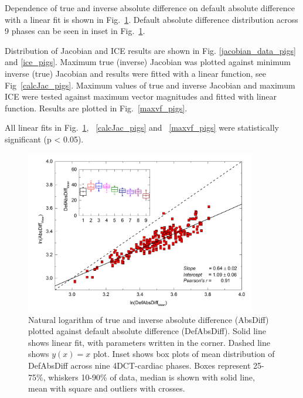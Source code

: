 \documentclass[type=dr, dr=rernat, accentcolor=tud7b,colorbacktitle, bigchapter, openright, twoside, 12pt ]{tudthesis}
\begin{document}
Dependence of true and inverse absolute difference on default absolute difference with a linear fit is shown in Fig.~\ref{absDiff_pigs}. Default absolute difference distribution across 9 phases can be seen in inset in Fig.~\ref{absDiff_pigs}.

Distribution of Jacobian and ICE results are shown in Fig. \ref{jacobian_data_pigs} and \ref{ice_pigs}. Maximum true (inverse) Jacobian was plotted against minimum inverse (true) Jacobian and results were fitted with a linear function, see Fig~\ref{calcJac_pigs}. Maximum values of true and inverse Jacobian and maximum ICE were tested against maximum vector magnitudes and fitted with linear function. Results are plotted in Fig.~\ref{maxvf_pigs}.

All linear fits in Fig.~\ref{absDiff_pigs}, ~\ref{calcJac_pigs} and ~\ref{maxvf_pigs} were statistically significant (p < 0.05).

\begin{figure}[H]
	\begin{center}		
		\includegraphics[width=0.9\textwidth]{./Images/AbsDiff_pigs.png}
		\caption{Natural logarithm of true and inverse absolute difference (AbsDiff) plotted against default absolute difference (DefAbsDiff). Solid line shows linear fit, with parameters
		written in the corner. Dashed line shows $y(x)=x$ plot. Inset shows box plots of mean distribution of DefAbsDiff across nine 4DCT-cardiac phases. Boxes represent 25-75\%, whiskers 10-90\%
		of data, median is shown with solid line, mean with square and outliers with crosses.}
		\label{absDiff_pigs}
	\end{center}
\end{figure}


\newpage
\end{document}
